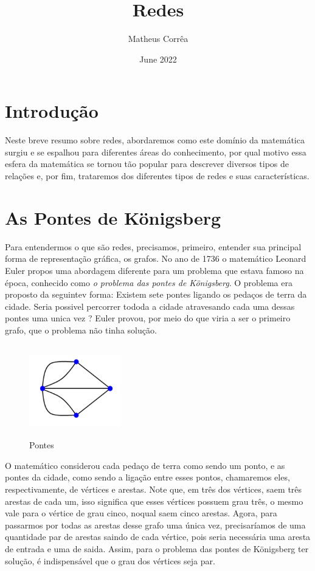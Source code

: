 \documentclass{article}
\title{Redes}
\author{Matheus Corrêa}
\date{June 2022}
\begin{document}
\maketitle

\section{Introdução}
Neste breve resumo sobre redes, abordaremos como este domínio da matemática surgiu e se espalhou para diferentes áreas do conhecimento, por qual motivo essa esfera da matemática se tornou tão popular para descrever diversos tipos de relações e, por fim, trataremos dos diferentes tipos de redes e suas características.

\section{As Pontes de Königsberg}
Para entendermos o que são redes, precisamos, primeiro, entender sua principal forma de representação gráfica, os grafos. No ano de 1736 o matemático Leonard Euler propos uma abordagem diferente para um problema que estava famoso na época, conhecido como  \textit{o problema das pontes de Königsberg}. O problema era proposto da seguintev forma: Existem sete pontes ligando os pedaços de terra da cidade. Seria possivel percorrer tododa a cidade atravesando cada uma dessas pontes uma unica vez ? Euler provou, por meio do que viria a ser o primeiro grafo, que o problema não tinha solução.


\begin{figure}
    \centering
    \includegraphics[width=4cm, height=4cm]{pontes}
    \caption{Pontes}
    \label{fig:my_label}
\end{figure}


O matemático considerou cada pedaço de terra como sendo um ponto, e as pontes da cidade, como sendo a ligação entre esses pontos, chamaremos eles, respectivamente, de vértices e arestas. Note que, em três dos vértices, saem três arestas de cada um, isso significa que esses vértices possuem grau três, o mesmo vale para o vértice de grau cinco, noqual saem cinco arestas. Agora, para passarmos por todas as arestas desse grafo uma única vez, precisaríamos de uma quantidade par de arestas saindo de cada vértice, pois seria necessária uma aresta de entrada e uma de saida. Assim, para o problema das pontes de Königsberg ter solução, é indispensável que o grau dos vértices seja par.
\end{document}
